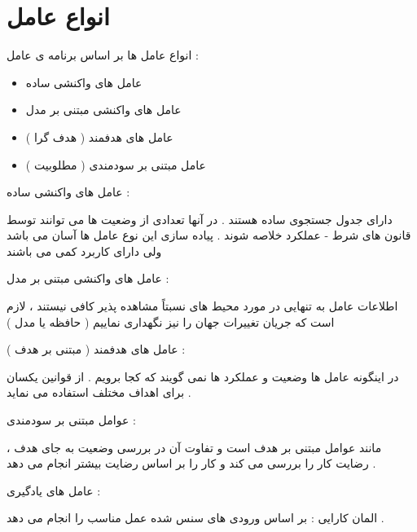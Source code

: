 \documentclass[12pt]{article}
\begin{document}
\newpage

\section{انواع عامل}

\noindent
انواع عامل ها بر اساس برنامه ی عامل :


\begin{itemize}
	\item عامل های واکنشی ساده
	\item عامل های واکنشی مبتنی بر مدل
	\item عامل های هدفمند ( هدف گرا )
	\item عامل مبتنی بر سودمندی ( مطلوبیت )
\end{itemize}


\noindent
عامل های واکنشی ساده 
 :

\noindent
دارای جدول جستجوی ساده هستند . در آنها تعدادی از وضعیت ها می توانند توسط قانون های شرط - عملکرد خلاصه شوند . پیاده سازی این نوع عامل ها آسان می باشد ولی دارای کاربرد کمی می باشند 


\vspace{10pt}

\noindent
عامل های واکنشی مبتنی بر مدل 
 :

\noindent
اطلاعات عامل به تنهایی در مورد محیط های نسبتاً مشاهده پذیر کافی نیستند ، لازم است که جریان تغییرات جهان را نیز نگهداری نماییم ( حافظه یا مدل )


\vspace{10pt}



\noindent
عامل های هدفمند ( مبتنی بر هدف ) 
 :

\noindent
در اینگونه عامل ها وضعیت و عملکرد ها نمی گویند که کجا برویم . از قوانین یکسان برای اهداف مختلف استفاده می نماید .


\vspace{10pt}



\noindent
عوامل مبتنی بر سودمندی 
 :

\noindent
مانند عوامل مبتنی بر هدف است و تفاوت آن در بررسی وضعیت به جای هدف ، رضایت کار را بررسی می کند و کار را بر اساس رضایت بیشتر انجام می دهد . 



\newpage

\noindent
عامل های یادگیری 
 :

\noindent
المان کارایی 
: بر اساس ورودی های سنس شده عمل مناسب را انجام  می دهد .
\end{document}
